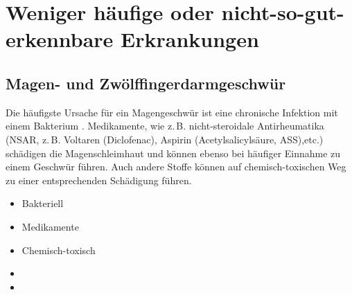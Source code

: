 % 
% 
% 
% 



\section{Weniger häufige oder nicht-so-gut-erkennbare Erkrankungen}

% 




\subsection{Magen- und Zwölffingerdarmgeschwür}
\label{topic:gastritis}



{
Die häufigste Ursache für ein Magengeschwür ist eine
chronische Infektion mit einem Bakterium  \citep{Malfertheiner2004}. Medikamente, wie
z.\,B. nicht-steroidale Antirheumatika (NSAR, z.\,B.
Voltaren{\texttrademark} (Diclofenac),
Aspirin{\texttrademark} (Acetylsalicylsäure, ASS),etc.)
schädigen die Magenschleimhaut und können ebenso bei
häufiger Einnahme zu einem Geschwür führen. Auch andere
Stoffe können auf chemisch-toxischen Weg zu einer
entsprechenden Schädigung führen.  
}{
\begin{itemize}
    \item Bakteriell 
    \item Medikamente
    \item Chemisch-toxisch
    \item {}
    \item {}
\end{itemize}
}{}{}{}

